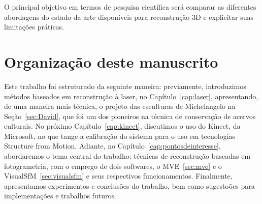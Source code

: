 O principal objetivo em termos de pesquisa científica será comparar as
diferentes abordagens do estado da arte disponíveis para reconstrução 3D e
explicitar suas limitações práticas.

\section*{Organização deste manuscrito}

Este trabalho foi estruturado da seguinte maneira: previamente, introduzimos métodos baseados em reconstrução à laser, no Capítulo~\ref{cap:laser}, apresentando, de uma maneira mais técnica, o projeto das esculturas de Michelangelo na Seção~\ref{sec:David}, que foi um dos pioneiros na técnica de conservação de acervos culturais. No próximo Capítulo~\ref{cap:kinect}, discutimos o uso do Kinect, da Microsoft, no que tange a calibração do sistema para o uso em tecnologias Structure from Motion. 
Adiante, no Capítulo~\ref{cap:pontosdeinteresse}, abordaremos o tema central do trabalho: técnicas de reconstrução baseadas em fotogrametria, com o emprego de dois softwares, o MVE~\ref{sec:mve} e o VisualSfM~\ref{sec:visualsfm} e seus respectivos funcionamentos. Finalmente, apresentamos experimentos e conclusões do trabalho, bem como sugestoões para implementações e trabalhos futuros.


